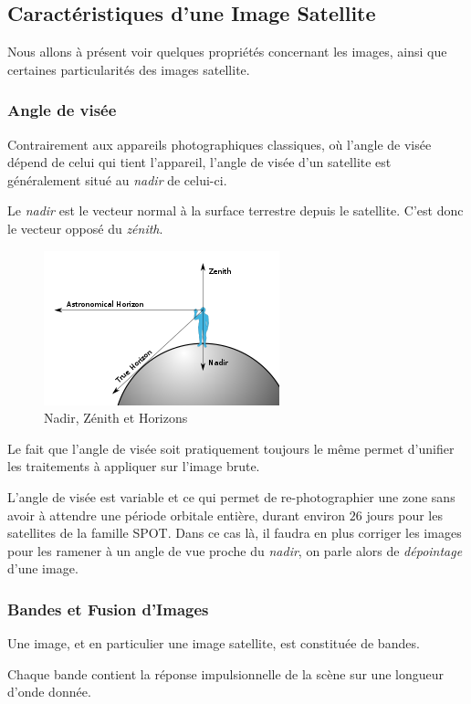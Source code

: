 \documentclass[a4paper, 10pt]{report}
\begin{document}
\subsection{Caractéristiques d'une Image Satellite}
Nous allons à présent voir quelques propriétés concernant les images, ainsi que certaines particularités des images satellite.
\subsubsection{Angle de visée}
Contrairement aux appareils photographiques classiques, où l'angle de visée dépend de celui qui tient l'appareil, l'angle de visée d'un satellite est généralement situé au \emph{nadir} de celui-ci.

Le \emph{nadir} est le vecteur normal à la surface terrestre depuis le satellite. C'est donc le vecteur opposé du \emph{zénith}.
\begin{figure}[H]
	\begin{center}
		\includegraphics[scale=0.5]{Images/Nadir.png}
		\caption{Nadir, Zénith et Horizons}
	\end{center}
\end{figure}

Le fait que l'angle de visée soit pratiquement toujours le même permet d'unifier les traitements à appliquer sur l'image brute.

L'angle de visée est variable et ce qui permet de re-photographier une zone sans avoir à attendre une période orbitale entière, durant environ $26$ jours pour les satellites de la famille SPOT. Dans ce cas là, il faudra en plus corriger les images pour les ramener à un angle de vue proche du \emph{nadir}, on parle alors de \emph{dépointage} d'une image.

\subsubsection{Bandes et Fusion d'Images}
Une image, et en particulier une image satellite, est constituée de bandes. 

Chaque bande contient la réponse impulsionnelle de la scène sur une longueur d'onde donnée.
\end{document}
